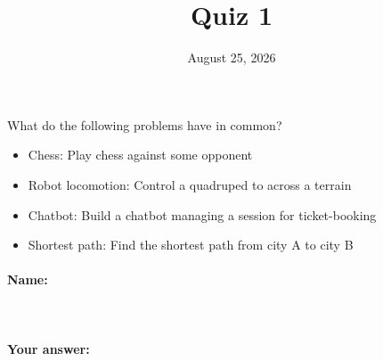 \title{Quiz 1}
\date{August 25, 2026}



What do the following problems have in common?
\begin{itemize}
    \item Chess: Play chess against some opponent
    \item Robot locomotion: Control a quadruped to across a terrain
    \item Chatbot: Build a chatbot managing a session for ticket-booking 
    \item Shortest path: Find the shortest path from city A to city B
\end{itemize}


\vspace{1em}
\paragraph{Name:}~\underline{\hspace{7cm}}
\paragraph{Your answer:}